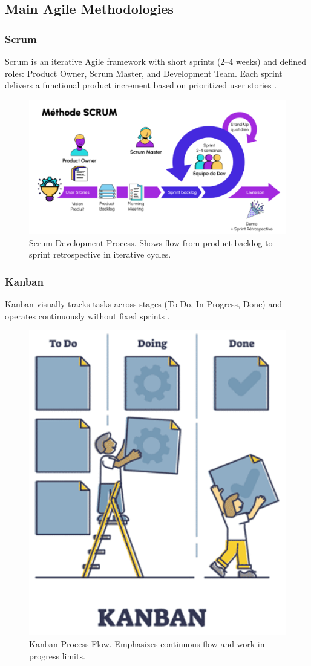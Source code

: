 \subsection{Main Agile Methodologies}

\subsubsection{Scrum}
Scrum is an iterative Agile framework with short sprints (2–4 weeks) and defined roles: Product Owner, Scrum Master, and Development Team. Each sprint delivers a functional product increment based on prioritized user stories \cite{scrumguide}.

\begin{figure}[H]
    \centering
    \includegraphics[width=0.7\columnwidth]{img/architecture/Scrum.png}
    \caption{Scrum Development Process. Shows flow from product backlog to sprint retrospective in iterative cycles.}
    \label{fig:scrum_process}
\end{figure}

\subsubsection{Kanban}
Kanban visually tracks tasks across stages (To Do, In Progress, Done) and operates continuously without fixed sprints \cite{agilemanifesto}.

\begin{figure}[H]
    \centering
    \includegraphics[width=0.45\columnwidth]{img/architecture/kanban.png}
    \caption{Kanban Process Flow. Emphasizes continuous flow and work-in-progress limits.}
    \label{fig:kanban_process}
\end{figure}

